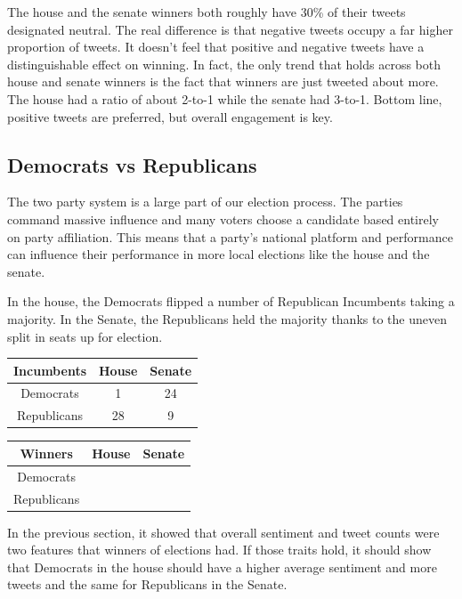 \documentclass[11pt, twoside, reqno]{book}
\begin{document}
The house and the senate winners both roughly have 30\% of their tweets designated neutral. The real difference is that negative tweets occupy a far higher proportion of tweets. It doesn't feel that positive and negative tweets have a distinguishable effect on winning. In fact, the only trend that holds across both house and senate winners is the fact that winners are just tweeted about more. The house had a ratio of about 2-to-1 while the senate had 3-to-1. Bottom line, positive tweets are preferred, but overall engagement is key. 

\subsection{Democrats vs Republicans}
The two party system is a large part of our election process. The parties command massive influence and many voters choose a candidate based entirely on party affiliation. This means that a party's national platform and performance can influence their performance in more local elections like the house and the senate. 

In the house, the Democrats flipped a number of Republican Incumbents taking a majority. In the Senate, the Republicans held the majority thanks to the uneven split in seats up for election.

\begin{center}
\begin{tabular}{|c|c|c|}
	\hline
	Incumbents & House & Senate \\
	\hline
	Democrats & 1 & 24\\
	\hline
	Republicans & 28 & 9\\
	\hline
\end{tabular}
\end{center}

\begin{center}
\begin{tabular}{|c|c|c|}
	\hline
	Winners & House & Senate \\
	\hline
	Democrats &  &  \\
	\hline
	Republicans &  &  \\
	\hline
\end{tabular}
\end{center}

In the previous section, it showed that overall sentiment and tweet counts were two features that winners of elections had. If those traits hold, it should show that Democrats in the house should have a higher average sentiment and more tweets and the same for Republicans in the Senate. 
\end{document}
